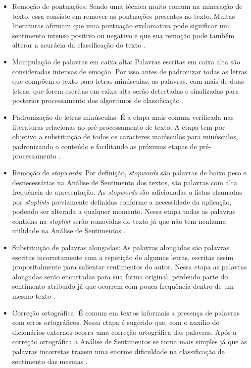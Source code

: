 \begin{itemize}
\item Remoção de pontuações: Sendo uma técnica muito comum na mineração de texto, essa consiste em remover as pontuações presentes no texto. Muitas literaturas afirmam que uma pontuação exclamativa pode significar um sentimento intenso positivo ou negativo e que sua remoção pode também alterar a acurácia da classificação do texto \cite{Lin2009}.

\item Manipulação de palavras em caixa alta: Palavras escritas em caixa alta são consideradas intensas de emoção. Por isso antes de padronizar todas as letras que compõem o texto para letras minúsculas, as palavras, com mais de duas letras, que forem escritas em caixa alta serão detectadas e sinalizadas para posterior processamento dos algoritmos de classificação \cite{inproceedings} .

\item Padronização de letras minúsculas: É a etapa mais comum verificada nas literaturas relacionas ao pré-processamento de texto. A etapa tem por objetivo a substituição de todos os caracteres maiúsculos para minúsculos, padronizando o conteúdo e facilitando as próximas etapas de pré-processamento \cite{DBLP:conf/coling/SantosG14}.

\item Remoção de \textit{stopwords}: Por definição, \textit{stopwords} são palavras de baixo peso e desnecessárias na Análise de Sentimento dos textos, são palavras com alta frequência de apresentação.  As \textit{stopwords} são adicionadas a listas chamadas por \textit{stoplists} previamente definidas conforme a necessidade da aplicação, podendo ser alterada a qualquer momento. Nessa etapa todas as palavras contidas na \textit{stoplist} serão removidas do texto já que não tem nenhuma utilidade na Análise de Sentimentos \cite{Ferilli2014}.

\item Substituição de palavras alongadas: As palavras alongadas são palavras escritas incorretamente com a repetição de algumas letras, escritas assim propositalmente para salientar sentimentos do autor. Nessa etapa as palavras alongadas serão encurtadas para sua forma original, perdendo parte do sentimento atribuído já que ocorrem com pouca frequência dentro de um mesmo texto \cite{Mohammad2015}.

\item Correção ortográfica: É comum em textos informais a presença de palavras com erros ortográficos. Nessa etapa é sugerido que, com o auxílio de dicionários externos ocorra uma correção ortográfica das palavras. Após a correção ortográfica a Análise de Sentimentos se torna mais simples já que as palavras incorretas trazem uma enorme dificuldade na classificação de sentimento das mesmas \cite{Miller:1995:WLD:219717.219748}.


\end{itemize}
